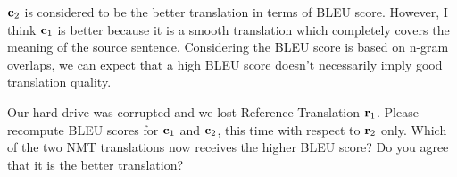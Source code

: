 \begin{parts}
\begin{subparts}
{            $\mathbf{c}_2$ is considered to be the better translation in terms of BLEU score. However, I think $\mathbf{c}_1$ is better because it is a smooth translation which completely covers the meaning of the source sentence. Considering the BLEU score is based on n-gram overlaps, we can expect that a high BLEU score doesn't necessarily imply good translation quality. 
        }
        
        
        \subpart[5] Our hard drive was corrupted and we lost Reference Translation $\mathbf{r}_1$. Please recompute BLEU scores for $\mathbf{c}_1$ and $\mathbf{c}_2$, this time with respect to $\mathbf{r}_2$ only. Which of the two NMT translations now receives the higher BLEU score? Do you agree that it is the better translation?
        
\end{subparts}
\end{parts}

